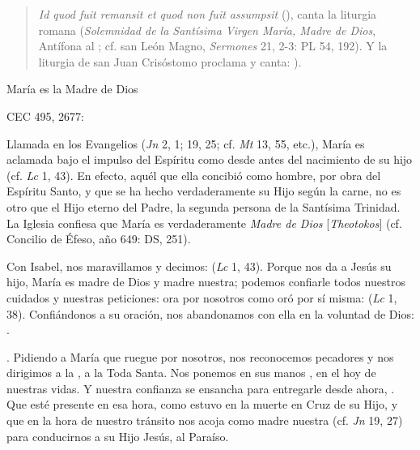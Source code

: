 \begin{quote}
\emph{Id quod fuit remansit et quod non fuit assumpsit} (), canta la liturgia romana (\emph{Solemnidad de la Santísima Virgen María, Madre de Dios}, Antífona al ; cf. san León Magno, \emph{Sermones} 21, 2-3: PL 54, 192). Y la liturgia de san Juan Crisóstomo proclama y canta: ).
\end{quote}
	

	
	María es la Madre de Dios
	
	CEC 495, 2677:
	
	
	 Llamada en los Evangelios  (\emph{Jn} 2, 1; 19, 25; cf. \emph{Mt} 13, 55, etc.), María es aclamada bajo el impulso del Espíritu como  desde antes del nacimiento de su hijo (cf. \emph{Lc} 1, 43). En efecto, aquél que ella concibió como hombre, por obra del Espíritu Santo, y que se ha hecho verdaderamente su Hijo según la carne, no es otro que el Hijo eterno del Padre, la segunda persona de la Santísima Trinidad. La Iglesia confiesa que María es verdaderamente \emph{Madre de Dios} {[}\emph{Theotokos}{]} (cf. Concilio de Éfeso, año 649: DS, 251).
	
	 \emph{} Con Isabel, nos maravillamos y decimos:  (\emph{Lc} 1, 43). Porque nos da a Jesús su hijo, María es madre de Dios y madre nuestra; podemos confiarle todos nuestros cuidados y nuestras peticiones: ora por nosotros como oró por sí misma:  (\emph{Lc} 1, 38). Confiándonos a su oración, nos abandonamos con ella en la voluntad de Dios: .
	
	\emph{}. Pidiendo a María que ruegue por nosotros, nos reconocemos pecadores y nos dirigimos a la , a la Toda Santa. Nos ponemos en sus manos , en el hoy de nuestras vidas. Y nuestra confianza se ensancha para entregarle desde ahora, . Que esté presente en esa hora, como estuvo en la muerte en Cruz de su Hijo, y que en la hora de nuestro tránsito nos acoja como madre nuestra (cf. \emph{Jn} 19, 27) para conducirnos a su Hijo Jesús, al Paraíso.
	
